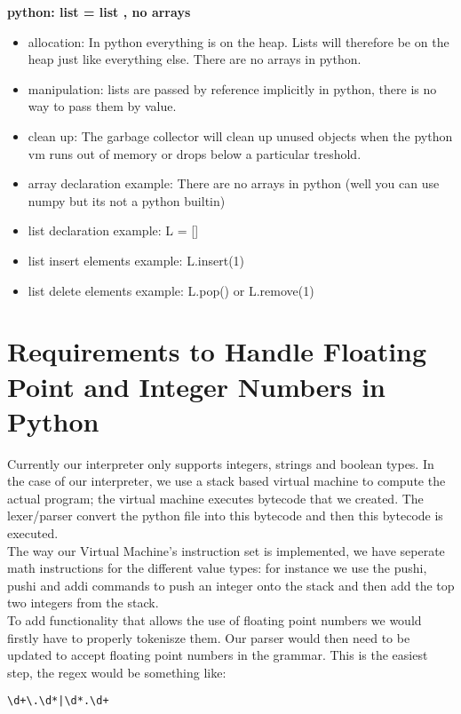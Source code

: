\documentclass[11pt]{article}
\begin{document}
\pagebreak
\textbf{python: list = list , no arrays}
\begin{itemize}
    \item allocation:
        In python everything is on the heap.  Lists will therefore be on the
        heap just like everything else.  There are no arrays in python.

    \item manipulation:
        lists are passed by reference implicitly in python, there is no way to
        pass them by value.

    \item clean up:
        The garbage collector will clean up unused objects when the python vm
        runs out of memory or drops below a particular treshold.

    \item array declaration example:
        There are no arrays in python (well you can use numpy but its not a
        python builtin)

    \item list declaration example:
        L = []

    \item list insert elements example:
        L.insert(1)

    \item list delete elements example:
        L.pop() or L.remove(1)
\end{itemize}




\newpage
\section{Requirements to Handle Floating Point and Integer Numbers in Python}
Currently our interpreter only supports integers, strings and boolean types.
In the case of our interpreter, we use a stack based virtual machine to compute
the actual program; the virtual machine executes bytecode that we created.  The
lexer/parser convert the python file into this bytecode and then this bytecode
is executed.\\

The way our Virtual Machine's instruction set is implemented, we have seperate
math instructions for the different value types: for instance we use
the pushi, pushi and addi commands to push an integer onto the stack and then add the
top two integers from the stack.\\

To add functionality that allows the use of floating point numbers we would
firstly have to properly tokenisze them.  Our parser would then need to be
updated to accept floating point numbers in the grammar.  This is the easiest
step, the regex would be something like:\\
\begin{lstlisting}
\d+\.\d*|\d*.\d+
\end{lstlisting}
\end{document}
